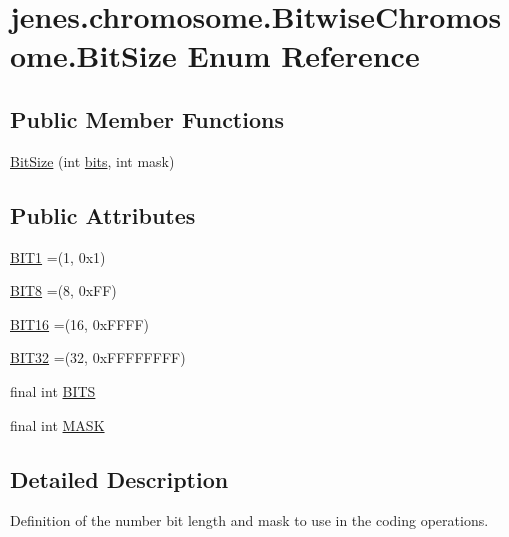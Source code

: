 \hypertarget{enumjenes_1_1chromosome_1_1_bitwise_chromosome_1_1_bit_size}{\section{jenes.\-chromosome.\-Bitwise\-Chromosome.\-Bit\-Size Enum Reference}
\label{enumjenes_1_1chromosome_1_1_bitwise_chromosome_1_1_bit_size}
}
\subsection*{Public Member Functions}
\begin{DoxyCompactItemize}
\item 
\hyperlink{enumjenes_1_1chromosome_1_1_bitwise_chromosome_1_1_bit_size_a2558272ed7bab3872598b55f7200106b}{Bit\-Size} (int \hyperlink{classjenes_1_1chromosome_1_1_bitwise_chromosome_a7b10180d49ba676325c2387b6e40d395}{bits}, int mask)
\end{DoxyCompactItemize}
\subsection*{Public Attributes}
\begin{DoxyCompactItemize}
\item 
\hyperlink{enumjenes_1_1chromosome_1_1_bitwise_chromosome_1_1_bit_size_a1c1800310dcf0a10eb4ec5262f67c4a9}{B\-I\-T1} =(1, 0x1)
\item 
\hyperlink{enumjenes_1_1chromosome_1_1_bitwise_chromosome_1_1_bit_size_a3d70a1d66121607b50d32fbf01dd3333}{B\-I\-T8} =(8, 0x\-F\-F)
\item 
\hyperlink{enumjenes_1_1chromosome_1_1_bitwise_chromosome_1_1_bit_size_a0b700c4a19af2e751fcaa42f44624e92}{B\-I\-T16} =(16, 0x\-F\-F\-F\-F)
\item 
\hyperlink{enumjenes_1_1chromosome_1_1_bitwise_chromosome_1_1_bit_size_a00d4f4e8c35a3d6e7e51a78be3206505}{B\-I\-T32} =(32, 0x\-F\-F\-F\-F\-F\-F\-F\-F)
\item 
final int \hyperlink{enumjenes_1_1chromosome_1_1_bitwise_chromosome_1_1_bit_size_a83754d4cd40d6f7cad7e7732f2494926}{B\-I\-T\-S}
\item 
final int \hyperlink{enumjenes_1_1chromosome_1_1_bitwise_chromosome_1_1_bit_size_a9566045bf22bb46793d909d09f69664b}{M\-A\-S\-K}
\end{DoxyCompactItemize}


\subsection{Detailed Description}
Definition of the number bit length and mask to use in the coding operations.

